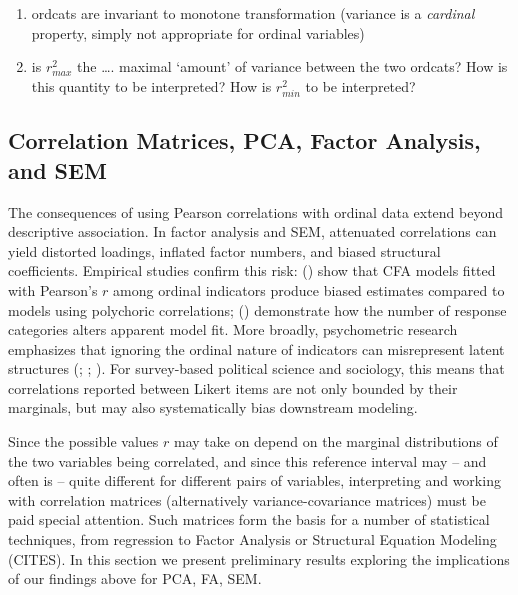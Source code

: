\documentclass[
  12pt,
]{article}
\providecommand{\tightlist}{%
  \setlength{\itemsep}{0pt}\setlength{\parskip}{0pt}}
\theoremstyle{plain}
\theoremstyle{definition}
\theoremstyle{remark}
\begin{document}
\begin{enumerate}
\def\labelenumi{\arabic{enumi}.}
\tightlist
\item
  ordcats are invariant to monotone transformation (variance is a
  \emph{cardinal} property, simply not appropriate for ordinal
  variables)
\item
  is \(r^2_{max}\) the \ldots. maximal `amount' of variance between the
  two ordcats? How is this quantity to be interpreted? How is
  \(r^2_{min}\) to be interpreted?
\end{enumerate}

\subsection{Correlation Matrices, PCA, Factor Analysis, and
SEM}\label{sec-matrices}

The consequences of using Pearson correlations with ordinal data extend
beyond descriptive association. In factor analysis and SEM, attenuated
correlations can yield distorted loadings, inflated factor numbers, and
biased structural coefficients. Empirical studies confirm this risk:
() show that CFA
models fitted with Pearson's \(r\) among ordinal indicators produce
biased estimates compared to models using polychoric correlations;
() demonstrate how the
number of response categories alters apparent model fit. More broadly,
psychometric research emphasizes that ignoring the ordinal nature of
indicators can misrepresent latent structures
(;
;
). For survey-based political
science and sociology, this means that correlations reported between
Likert items are not only bounded by their marginals, but may also
systematically bias downstream modeling.

Since the possible values \(r\) may take on depend on the marginal
distributions of the two variables being correlated, and since this
reference interval may -- and often is -- quite different for different
pairs of variables, interpreting and working with correlation matrices
(alternatively variance-covariance matrices) must be paid special
attention. Such matrices form the basis for a number of statistical
techniques, from regression to Factor Analysis or Structural Equation
Modeling (CITES). In this section we present preliminary results
exploring the implications of our findings above for PCA, FA, SEM.
\end{document}
